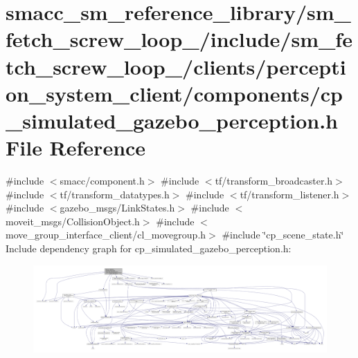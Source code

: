 \hypertarget{sm__fetch__screw__loop__1_2include_2sm__fetch__screw__loop__1_2clients_2perception__system__clie071e67c5e368edaa0c41500876620cab}{}\section{smacc\+\_\+sm\+\_\+reference\+\_\+library/sm\+\_\+fetch\+\_\+screw\+\_\+loop\+\_/include/sm\+\_\+fetch\+\_\+screw\+\_\+loop\+\_/clients/perception\+\_\+system\+\_\+client/components/cp\+\_\+simulated\+\_\+gazebo\+\_\+perception.h File Reference}
\label{sm__fetch__screw__loop__1_2include_2sm__fetch__screw__loop__1_2clients_2perception__system__clie071e67c5e368edaa0c41500876620cab}
{\ttfamily \#include $<$smacc/component.\+h$>$}\newline
{\ttfamily \#include $<$tf/transform\+\_\+broadcaster.\+h$>$}\newline
{\ttfamily \#include $<$tf/transform\+\_\+datatypes.\+h$>$}\newline
{\ttfamily \#include $<$tf/transform\+\_\+listener.\+h$>$}\newline
{\ttfamily \#include $<$gazebo\+\_\+msgs/\+Link\+States.\+h$>$}\newline
{\ttfamily \#include $<$moveit\+\_\+msgs/\+Collision\+Object.\+h$>$}\newline
{\ttfamily \#include $<$move\+\_\+group\+\_\+interface\+\_\+client/cl\+\_\+movegroup.\+h$>$}\newline
{\ttfamily \#include \char`\"{}cp\+\_\+scene\+\_\+state.\+h\char`\"{}}\newline
Include dependency graph for cp\+\_\+simulated\+\_\+gazebo\+\_\+perception.\+h\+:
\nopagebreak
\begin{figure}[H]
\begin{center}
\leavevmode
\includegraphics[width=350pt]{sm__fetch__screw__loop__1_2include_2sm__fetch__screw__loop__1_2clients_2perception__system__clie86b59769ee66382c8c59bffb394a2f4e}
\end{center}
\end{figure}
